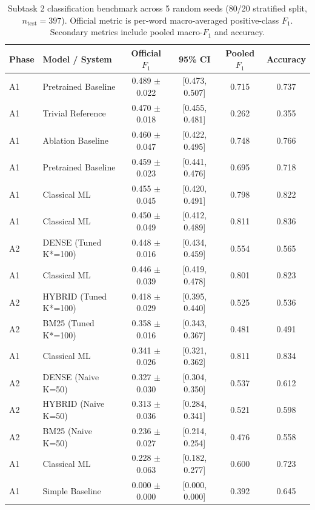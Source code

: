 \begin{table}[t]
\centering
\small
\begin{tabular}{llcccc}
\toprule
\textbf{Phase} & \textbf{Model / System} & \textbf{Official $F_1$} & \textbf{95\% CI} & \textbf{Pooled $F_1$} & \textbf{Accuracy} \\
\midrule
A1 & Pretrained Baseline & 0.489 $\pm$ 0.022 & [0.473, 0.507] & 0.715 & 0.737 \\
A1 & Trivial Reference & 0.470 $\pm$ 0.018 & [0.455, 0.481] & 0.262 & 0.355 \\
A1 & Ablation Baseline & 0.460 $\pm$ 0.047 & [0.422, 0.495] & 0.748 & 0.766 \\
A1 & Pretrained Baseline & 0.459 $\pm$ 0.023 & [0.441, 0.476] & 0.695 & 0.718 \\
A1 & Classical ML & 0.455 $\pm$ 0.045 & [0.420, 0.491] & 0.798 & 0.822 \\
A1 & Classical ML & 0.450 $\pm$ 0.049 & [0.412, 0.489] & 0.811 & 0.836 \\
A2 & DENSE (Tuned K*=100) & 0.448 $\pm$ 0.016 & [0.434, 0.459] & 0.554 & 0.565 \\
A1 & Classical ML & 0.446 $\pm$ 0.039 & [0.419, 0.478] & 0.801 & 0.823 \\
A2 & HYBRID (Tuned K*=100) & 0.418 $\pm$ 0.029 & [0.395, 0.440] & 0.525 & 0.536 \\
A2 & BM25 (Tuned K*=100) & 0.358 $\pm$ 0.016 & [0.343, 0.367] & 0.481 & 0.491 \\
A1 & Classical ML & 0.341 $\pm$ 0.026 & [0.321, 0.362] & 0.811 & 0.834 \\
A2 & DENSE (Naive K=50) & 0.327 $\pm$ 0.030 & [0.304, 0.350] & 0.537 & 0.612 \\
A2 & HYBRID (Naive K=50) & 0.313 $\pm$ 0.036 & [0.284, 0.341] & 0.521 & 0.598 \\
A2 & BM25 (Naive K=50) & 0.236 $\pm$ 0.027 & [0.214, 0.254] & 0.476 & 0.558 \\
A1 & Classical ML & 0.228 $\pm$ 0.063 & [0.182, 0.277] & 0.600 & 0.723 \\
A1 & Simple Baseline & 0.000 $\pm$ 0.000 & [0.000, 0.000] & 0.392 & 0.645 \\
\bottomrule
\end{tabular}
\caption{Subtask 2 classification benchmark across 5 random seeds (80/20 stratified split, $n_{\text{test}}=397$). Official metric is per-word macro-averaged positive-class $F_1$. Secondary metrics include pooled macro-$F_1$ and accuracy.}
\label{tab:subtask2_benchmark}
\end{table}